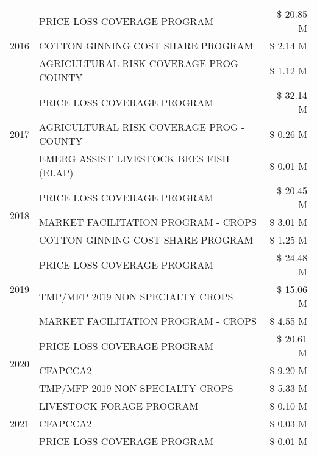 \begin{tabular}{llr}
\multirow[t]{3}{*}{2016} & PRICE LOSS COVERAGE PROGRAM & \$ 20.85 M \\
 & COTTON GINNING COST SHARE PROGRAM & \$ 2.14 M \\
 & AGRICULTURAL RISK COVERAGE PROG - COUNTY & \$ 1.12 M \\
\cline{1-3}
\multirow[t]{3}{*}{2017} & PRICE LOSS COVERAGE PROGRAM & \$ 32.14 M \\
 & AGRICULTURAL RISK COVERAGE PROG - COUNTY & \$ 0.26 M \\
 & EMERG ASSIST LIVESTOCK BEES FISH (ELAP) & \$ 0.01 M \\
\cline{1-3}
\multirow[t]{3}{*}{2018} & PRICE LOSS COVERAGE PROGRAM & \$ 20.45 M \\
 & MARKET FACILITATION PROGRAM - CROPS & \$ 3.01 M \\
 & COTTON GINNING COST SHARE PROGRAM & \$ 1.25 M \\
\cline{1-3}
\multirow[t]{3}{*}{2019} & PRICE LOSS COVERAGE PROGRAM & \$ 24.48 M \\
 & TMP/MFP 2019 NON SPECIALTY CROPS & \$ 15.06 M \\
 & MARKET FACILITATION PROGRAM - CROPS & \$ 4.55 M \\
\cline{1-3}
\multirow[t]{3}{*}{2020} & PRICE LOSS COVERAGE PROGRAM & \$ 20.61 M \\
 & CFAPCCA2 & \$ 9.20 M \\
 & TMP/MFP 2019 NON SPECIALTY CROPS & \$ 5.33 M \\
\cline{1-3}
\multirow[t]{3}{*}{2021} & LIVESTOCK FORAGE PROGRAM & \$ 0.10 M \\
 & CFAPCCA2 & \$ 0.03 M \\
 & PRICE LOSS COVERAGE PROGRAM & \$ 0.01 M \\
\cline{1-3}
\bottomrule
\end{tabular}
